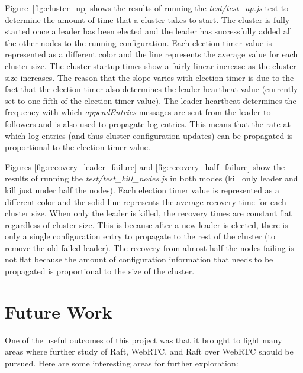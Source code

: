 \documentclass[conference,compsoc]{./IEEEtran/IEEEtran}
\begin{document}
Figure~\ref{fig:cluster_up} shows the results of running the \emph{test/test\_up.js} test to determine the amount of time that a cluster takes to start. The cluster is fully started once a leader has been elected and the leader has successfully added all the other nodes to the running configuration. Each election timer value is represented as a different color and the line represents the average value for each cluster size. The cluster startup times show a fairly linear increase as the cluster size increases. The reason that the slope varies with election timer is due to the fact that the election timer also determines the leader heartbeat value (currently set to one fifth of the election timer value). The leader heartbeat determines the frequency with which \emph{appendEntries} messages are sent from the leader to followers and is also used to propagate log entries.  This means that the rate at which log entries (and thus cluster configuration updates) can be propagated is proportional to the election timer value.

Figures \ref{fig:recovery_leader_failure} and \ref{fig:recovery_half_failure} show the results of running the \emph{test/test\_kill\_nodes.js} in both modes (kill only leader and kill just under half the nodes). Each election timer value is represented as a different color and the solid line represents the average recovery time for each cluster size. When only the leader is killed, the recovery times are constant flat regardless of cluster size. This is because after a new leader is elected, there is only a single configuration entry to propagate to the rest of the cluster (to remove the old failed leader). The recovery from almost half the nodes failing is not flat because the amount of configuration information that needs to be propagated is proportional to the size of the cluster.


\section{Future Work}

One of the useful outcomes of this project was that it brought to light many areas where further study of Raft, WebRTC, and Raft over WebRTC should be pursued. Here are some interesting areas for further exploration:
\end{document}
